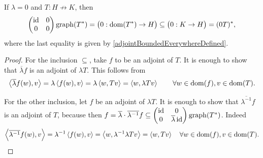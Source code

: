 If $\lambda = 0$ and $T: H\not\to K$, then
\[ \begin{pmatrix}
\operatorname{id} & 0 \\ 0 & 0
\end{pmatrix} \operatorname{graph}(T^*) = \big(0: \operatorname{dom}(T^*)\to H\big) \subseteq \big(0: K\to H\big) = (0 T)^*, \]
where the last equality is given by \ref{adjointBoundedEverywhereDefined}.
\begin{proof}
For the inclusion $\subseteq$, take $f$ to be an adjoint of $T$. It is enough to show that $\overline{\lambda}f$ is an adjoint of $\lambda T$. This follows from
\[ \left\langle \overline{\lambda}f(w), v \right\rangle = \lambda\left\langle f(w), v \right\rangle = \lambda\left\langle w,Tv \right\rangle = \left\langle w,\lambda Tv \right\rangle \qquad \forall w\in \operatorname{dom}(f), v\in \operatorname{dom}(T). \]

For the other inclusion, let $f$ be an adjoint of $\lambda T$. It is enough to show that $\overline{\lambda^{-1}}f$ is an adjoint of $T$, because then $f = \overline{\lambda}\cdot\overline{\lambda^{-1}}f \subseteq \begin{pmatrix}
\operatorname{id} & 0 \\ 0 & \overline{\lambda}\operatorname{id}
\end{pmatrix} \operatorname{graph}(T^*)$. Indeed
\[ \left\langle \overline{\lambda^{-1}}f(w), v \right\rangle = \lambda^{-1}\left\langle f(w),v \right\rangle = \left\langle w,\lambda^{-1}\lambda Tv \right\rangle = \left\langle w,Tv \right\rangle \quad \forall w\in \operatorname{dom}(f), v\in \operatorname{dom}(T). \]
\end{proof}

